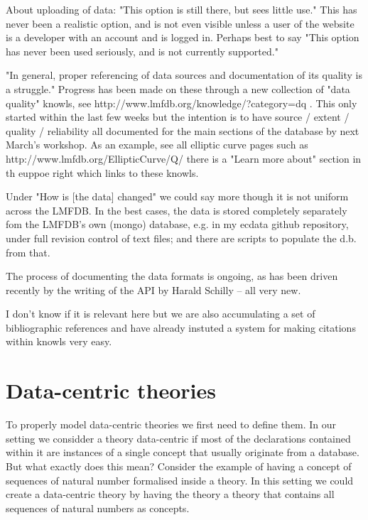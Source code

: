 \documentclass{deliverablereport}
\begin{document}
About uploading of data: "This option is still there, but sees little
use."  This has never been a realistic option, and is not even visible
unless a user of the website is a developer with an account and is logged
in.  Perhaps best to say "This option has never been used seriously, and is
not currently supported."

"In general, proper referencing of data sources and documentation of its
quality is a struggle."   Progress has been made on these through a new
collection of "data quality" knowls, see
http://www.lmfdb.org/knowledge/?category=dq .  This only started within the
last few weeks but the intention is to have source / extent / quality /
reliability all documented for the main sections of the database by next
March's workshop.  As an example, see all elliptic curve pages such as
http://www.lmfdb.org/EllipticCurve/Q/  there is a "Learn more about"
section in th euppoe right which links to these knowls.

Under "How is [the data] changed" we could say more though it is not
uniform across the LMFDB.  In the best cases, the data is stored completely
separately fom the LMFDB's own (mongo) database, e.g. in my ecdata github
repository, under full revision control of text files;  and there are
scripts to populate the d.b. from that.

The process of documenting the data formats is ongoing, as has been driven
recently by the writing of the API by Harald Schilly -- all very new.

I don't know if it is relevant here but we are also accumulating a set of
bibliographic references and have already instuted a system for making
citations within knowls very easy.

\section{Data-centric theories}\label{sec:data}


To properly model data-centric theories we first need to define them. In our setting we considder a theory data-centric if most of the declarations contained within it are instances of a single concept that usually originate from a database. But what exactly does this mean? Consider the example of having a concept of sequences of natural number formalised inside a theory. In this setting we could create a data-centric theory by having the theory a theory that contains all sequences of natural numbers as concepts.
\end{document}
